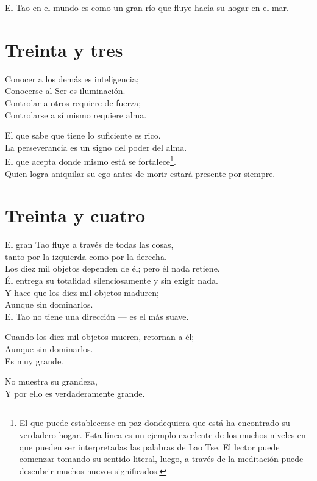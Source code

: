 \documentclass[hidelinks]{memoir}
\begin{document}
	El Tao en el mundo es como un gran río que fluye hacia su hogar en el
	mar.
	
	\chapter*{Treinta y tres}
	
	Conocer a los demás es inteligencia;\\
	Conocerse al Ser es iluminación.\\
	Controlar a otros requiere de fuerza;\\
	Controlarse a sí mismo requiere alma.
	
	El que sabe que tiene lo suficiente es rico.\\
	La perseverancia es un signo del poder del alma.\\
	El que acepta donde mismo está se fortalece\footnote{El que puede establecerse en paz dondequiera que está ha encontrado su
		verdadero hogar. Esta línea es un ejemplo excelente de los muchos
		niveles en que pueden ser interpretadas las palabras de Lao Tse. El
		lector puede comenzar tomando su sentido literal, luego, a través de la
		meditación puede descubrir muchos nuevos significados.}.\\
	Quien logra aniquilar su ego antes de morir estará presente por siempre.
	
	\chapter*{Treinta y cuatro}
	
	El gran Tao fluye a través de todas las cosas,\\
	tanto por la izquierda como por la derecha.\\
	Los diez mil objetos dependen de él; pero él nada retiene.\\
	Él entrega su totalidad silenciosamente y sin exigir nada.\\
	Y hace que los diez mil objetos maduren;\\
	Aunque sin dominarlos.\\
	El Tao no tiene una dirección --- es el más suave.
	
	Cuando los diez mil objetos mueren, retornan a él;\\
	Aunque sin dominarlos.\\
	Es muy grande.
	
	No muestra su grandeza,\\
	Y por ello es verdaderamente grande.
	
\end{document}
